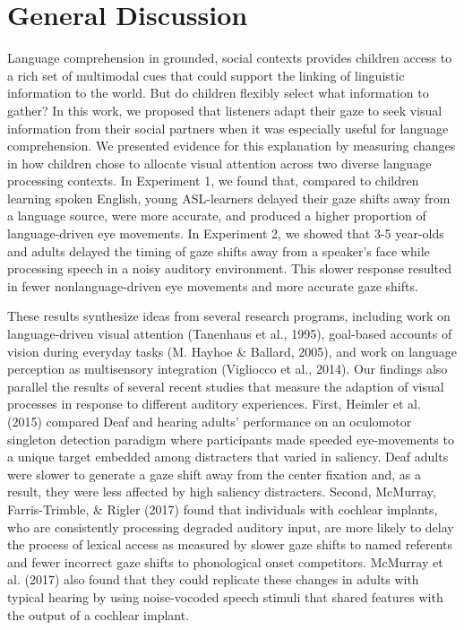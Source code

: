 \documentclass[oneside]{report}
\begin{document}
\section{General Discussion}\label{general-discussion}

Language comprehension in grounded, social contexts provides children
access to a rich set of multimodal cues that could support the linking
of linguistic information to the world. But do children flexibly select
what information to gather? In this work, we proposed that listeners
adapt their gaze to seek visual information from their social partners
when it was especially useful for language comprehension. We presented
evidence for this explanation by measuring changes in how children chose
to allocate visual attention across two diverse language processing
contexts. In Experiment 1, we found that, compared to children learning
spoken English, young ASL-learners delayed their gaze shifts away from a
language source, were more accurate, and produced a higher proportion of
language-driven eye movements. In Experiment 2, we showed that 3-5
year-olds and adults delayed the timing of gaze shifts away from a
speaker's face while processing speech in a noisy auditory environment.
This slower response resulted in fewer nonlanguage-driven eye movements
and more accurate gaze shifts.

These results synthesize ideas from several research programs, including
work on language-driven visual attention (Tanenhaus et al., 1995),
goal-based accounts of vision during everyday tasks (M. Hayhoe \&
Ballard, 2005), and work on language perception as multisensory
integration (Vigliocco et al., 2014). Our findings also parallel the
results of several recent studies that measure the adaption of visual
processes in response to different auditory experiences. First, Heimler
et al. (2015) compared Deaf and hearing adults' performance on an
oculomotor singleton detection paradigm where participants made speeded
eye-movements to a unique target embedded among distracters that varied
in saliency. Deaf adults were slower to generate a gaze shift away from
the center fixation and, as a result, they were less affected by high
saliency distracters. Second, McMurray, Farris-Trimble, \& Rigler (2017)
found that individuals with cochlear implants, who are consistently
processing degraded auditory input, are more likely to delay the process
of lexical access as measured by slower gaze shifts to named referents
and fewer incorrect gaze shifts to phonological onset competitors.
McMurray et al. (2017) also found that they could replicate these
changes in adults with typical hearing by using noise-vocoded speech
stimuli that shared features with the output of a cochlear implant.
\end{document}
